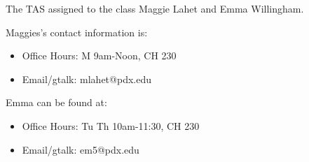The TAS assigned to the class Maggie Lahet and 
Emma Willingham. 

Maggies's contact information is:
\begin{itemize}
\item Office Hours: M 9am-Noon, CH 230
\item Email/gtalk: mlahet@pdx.edu  
\end{itemize}

Emma can be found at:
\begin{itemize}
\item Office Hours: Tu Th 10am-11:30, CH 230
\item Email/gtalk: em5@pdx.edu 
\end{itemize}
